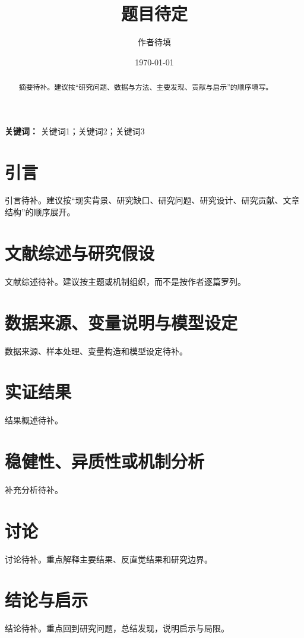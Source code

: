 \documentclass[12pt]{ctexart}
\title{题目待定}
\author{作者待填}
\date{\today}
\begin{document}
\maketitle

\begin{abstract}
摘要待补。建议按“研究问题、数据与方法、主要发现、贡献与启示”的顺序填写。
\end{abstract}

\noindent\textbf{关键词：} 关键词1；关键词2；关键词3

\section{引言}
引言待补。建议按“现实背景、研究缺口、研究问题、研究设计、研究贡献、文章结构”的顺序展开。

\section{文献综述与研究假设}
文献综述待补。建议按主题或机制组织，而不是按作者逐篇罗列。

\section{数据来源、变量说明与模型设定}
数据来源、样本处理、变量构造和模型设定待补。

\section{实证结果}
结果概述待补。
% 
% 

\section{稳健性、异质性或机制分析}
补充分析待补。

\section{讨论}
讨论待补。重点解释主要结果、反直觉结果和研究边界。

\section{结论与启示}
结论待补。重点回到研究问题，总结发现，说明启示与局限。

% 
% 
\end{document}
